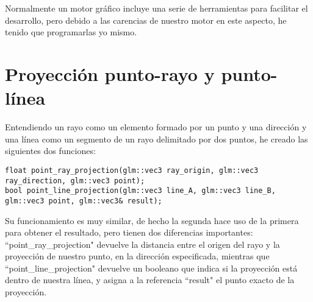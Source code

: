 Normalmente un motor gráfico incluye una serie de herramientas para facilitar el desarrollo, pero debido a las carencias de nuestro motor en este aspecto, he tenido que programarlas yo mismo.

\section{Proyección punto-rayo y punto-línea}
Entendiendo un rayo como un elemento formado por un punto y una dirección y una línea como un segmento de un rayo delimitado por dos puntos, he creado las siguientes dos funciones:

\begin{lstlisting}
float point_ray_projection(glm::vec3 ray_origin, glm::vec3 ray_direction, glm::vec3 point);
bool point_line_projection(glm::vec3 line_A, glm::vec3 line_B, glm::vec3 point, glm::vec3& result);
\end{lstlisting}

Su funcionamiento es muy similar, de hecho la segunda hace uso de la primera para obtener el resultado, pero tienen dos diferencias importantes: ``point\_ray\_projection" devuelve la distancia entre el origen del rayo y la proyección de nuestro punto, en la dirección especificada, mientras que ``point\_line\_projection" devuelve un booleano que indica si la proyección está dentro de nuestra línea, y asigna a la referencia ``result" el punto exacto de la proyección.
